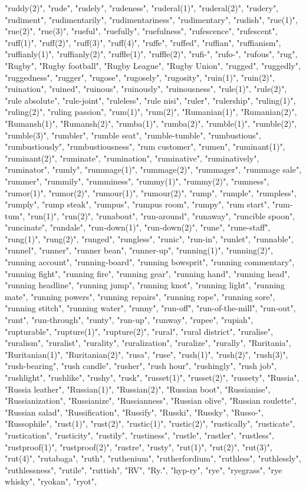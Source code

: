 "ruddy(2)",
"rude",
"rudely",
"rudeness",
"ruderal(1)",
"ruderal(2)",
"rudery",
"rudiment",
"rudimentarily",
"rudimentariness",
"rudimentary",
"rudish",
"rue(1)",
"rue(2)",
"rue(3)",
"rueful",
"ruefully",
"ruefulness",
"rufescence",
"rufescent",
"ruff(1)",
"ruff(2)",
"ruff(3)",
"ruff(4)",
"ruffe",
"ruffed",
"ruffian",
"ruffianism",
"ruffianly(1)",
"ruffianly(2)",
"ruffle(1)",
"ruffle(2)",
"rufi-",
"rufo-",
"rufous",
"rug",
"Rugby",
"Rugby football",
"Rugby League",
"Rugby Union",
"rugged",
"ruggedly",
"ruggedness",
"rugger",
"rugose",
"rugosely",
"rugosity",
"ruin(1)",
"ruin(2)",
"ruination",
"ruined",
"ruinous",
"ruinously",
"ruinousness",
"rule(1)",
"rule(2)",
"rule absolute",
"rule-joint",
"ruleless",
"rule nisi",
"ruler",
"rulership",
"ruling(1)",
"ruling(2)",
"ruling passion",
"rum(1)",
"rum(2)",
"Rumanian(1)",
"Rumanian(2)",
"Rumansh(1)",
"Rumansh(2)",
"rumba(1)",
"rumba(2)",
"rumble(1)",
"rumble(2)",
"rumble(3)",
"rumbler",
"rumble seat",
"rumble-tumble",
"rumbustious",
"rumbustiously",
"rumbustiousness",
"rum customer",
"rumen",
"ruminant(1)",
"ruminant(2)",
"ruminate",
"rumination",
"ruminative",
"ruminatively",
"ruminator",
"rumly",
"rummage(1)",
"rummage(2)",
"rummager",
"rummage sale",
"rummer",
"rummily",
"rumminess",
"rummy(1)",
"rummy(2)",
"rumness",
"rumor(1)",
"rumor(2)",
"rumour(1)",
"rumour(2)",
"rump",
"rumple",
"rumpless",
"rumply",
"rump steak",
"rumpus",
"rumpus room",
"rumpy",
"rum start",
"rum-tum",
"run(1)",
"run(2)",
"runabout",
"run-around",
"runaway",
"runcible spoon",
"runcinate",
"rundale",
"run-down(1)",
"run-down(2)",
"rune",
"rune-staff",
"rung(1)",
"rung(2)",
"runged",
"rungless",
"runic",
"run-in",
"runlet",
"runnable",
"runnel",
"runner",
"runner bean",
"runner-up",
"running(1)",
"running(2)",
"running account",
"running-board",
"running bowsprit",
"running commentary",
"running fight",
"running fire",
"running gear",
"running hand",
"running head",
"running headline",
"running jump",
"running knot",
"running light",
"running mate",
"running powers",
"running repairs",
"running rope",
"running sore",
"running stitch",
"running water",
"runny",
"run-off",
"run-of-the-mill",
"run-out",
"runt",
"run-through",
"runty",
"run-up",
"runway",
"rupee",
"rupiah",
"rupturable",
"rupture(1)",
"rupture(2)",
"rural",
"rural district",
"ruralise",
"ruralism",
"ruralist",
"rurality",
"ruralization",
"ruralize",
"rurally",
"Ruritania",
"Ruritanian(1)",
"Ruritanian(2)",
"rusa",
"ruse",
"rush(1)",
"rush(2)",
"rush(3)",
"rush-bearing",
"rush candle",
"rusher",
"rush hour",
"rushingly",
"rush job",
"rushlight",
"rushlike",
"rushy",
"rusk",
"russet(1)",
"russet(2)",
"russety",
"Russia",
"Russia leather",
"Russian(1)",
"Russian(2)",
"Russian boot",
"Russianise",
"Russianization",
"Russianize",
"Russianness",
"Russian olive",
"Russian roulette",
"Russian salad",
"Russification",
"Russify",
"Russki",
"Russky",
"Russo-",
"Russophile",
"rust(1)",
"rust(2)",
"rustic(1)",
"rustic(2)",
"rustically",
"rusticate",
"rustication",
"rusticity",
"rustily",
"rustiness",
"rustle",
"rustler",
"rustless",
"rustproof(1)",
"rustproof(2)",
"rustre",
"rusty",
"rut(1)",
"rut(2)",
"rut(3)",
"rut(4)",
"rutabaga",
"ruth",
"ruthenium",
"rutherfordium",
"ruthless",
"ruthlessly",
"ruthlessness",
"rutile",
"ruttish",
"RV",
"Ry.",
"hyp-ry",
"rye",
"ryegrass",
"rye whisky",
"ryokan",
"ryot",
